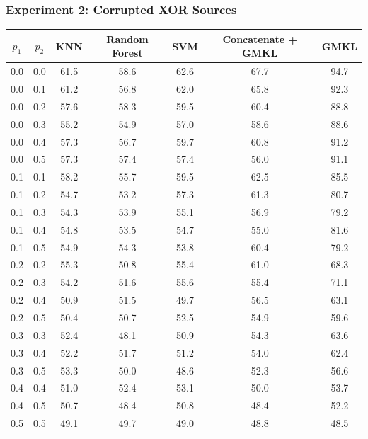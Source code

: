 \documentclass{article}
\begin{document}
\begin{minipage}{\textwidth}
\centering
\subsubsection*{Experiment 2: Corrupted XOR Sources}
\begin{tabular}{|c| c| c| c| c| c| c|}
\hline
$p_1$ & $p_2$ & KNN & Random Forest & SVM & Concatenate + GMKL & GMKL \\
\hline
0.0 & 0.0 & 61.5 & 58.6 & 62.6 & 67.7 & 94.7 \\
\hline
0.0 & 0.1 & 61.2 & 56.8 & 62.0 & 65.8 & 92.3 \\
\hline
0.0 & 0.2 & 57.6 & 58.3 & 59.5 & 60.4 & 88.8 \\
\hline
0.0 & 0.3 & 55.2 & 54.9 & 57.0 & 58.6 & 88.6 \\
\hline
0.0 & 0.4 & 57.3 & 56.7 & 59.7 & 60.8 & 91.2 \\
\hline
0.0 & 0.5 & 57.3 & 57.4 & 57.4 & 56.0 & 91.1 \\
\hline
0.1 & 0.1 & 58.2 & 55.7 & 59.5 & 62.5 & 85.5 \\
\hline
0.1 & 0.2 & 54.7 & 53.2 & 57.3 & 61.3 & 80.7 \\
\hline
0.1 & 0.3 & 54.3 & 53.9 & 55.1 & 56.9 & 79.2 \\
\hline
0.1 & 0.4 & 54.8 & 53.5 & 54.7 & 55.0 & 81.6 \\
\hline
0.1 & 0.5 & 54.9 & 54.3 & 53.8 & 60.4 & 79.2 \\
\hline
0.2 & 0.2 & 55.3 & 50.8 & 55.4 & 61.0 & 68.3 \\
\hline
0.2 & 0.3 & 54.2 & 51.6 & 55.6 & 55.4 & 71.1 \\
\hline
0.2 & 0.4 & 50.9 & 51.5 & 49.7 & 56.5 & 63.1 \\
\hline
0.2 & 0.5 & 50.4 & 50.7 & 52.5 & 54.9 & 59.6 \\
\hline
0.3 & 0.3 & 52.4 & 48.1 & 50.9 & 54.3 & 63.6 \\
\hline
0.3 & 0.4 & 52.2 & 51.7 & 51.2 & 54.0 & 62.4 \\
\hline
0.3 & 0.5 & 53.3 & 50.0 & 48.6 & 52.3 & 56.6 \\
\hline
0.4 & 0.4 & 51.0 & 52.4 & 53.1 & 50.0 & 53.7 \\
\hline
0.4 & 0.5 & 50.7 & 48.4 & 50.8 & 48.4 & 52.2 \\
\hline
0.5 & 0.5 & 49.1 & 49.7 & 49.0 & 48.8 & 48.5 \\
\hline
\end{tabular}
\end{minipage}
\end{document}
